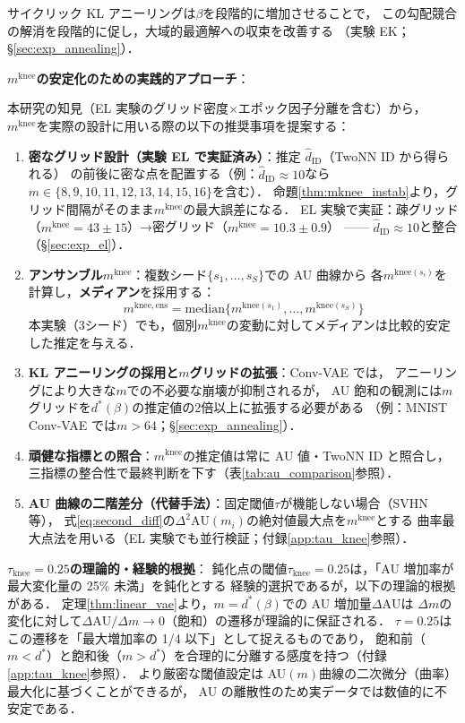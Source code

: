 \documentclass[11pt,a4paper]{jsarticle}
\newcommand{\mknee}{m^{\mathrm{knee}}}
\begin{document}
サイクリック KL アニーリング\cite{fu2019cyclical}は$\beta$を段階的に増加させることで，
この勾配競合の解消を段階的に促し，大域的最適解への収束を改善する
（実験 EK；§\ref{sec:exp_annealing}）．

\textbf{$\mknee$の安定化のための実践的アプローチ}：

本研究の知見（EL 実験のグリッド密度×エポック因子分離を含む）から，
$\mknee$を実際の設計に用いる際の以下の推奨事項を提案する：
\begin{enumerate}
  \item \textbf{密なグリッド設計（実験 EL で実証済み）}：推定 $\hat{d}_\mathrm{ID}$（TwoNN ID から得られる）
        の前後に密な点を配置する（例：$\hat{d}_\mathrm{ID} \approx 10$なら$m \in \{8,9,10,11,12,13,14,15,16\}$を含む）．
        命題\ref{thm:mknee_instab}より，グリッド間隔がそのまま$\mknee$の最大誤差になる．
        EL 実験で実証：疎グリッド（$\mknee=43\pm15$）→密グリッド（$\mknee=10.3\pm0.9$）
        —— $\hat{d}_\mathrm{ID} \approx 10$と整合（§\ref{sec:exp_el}）．
  \item \textbf{アンサンブル$\mknee$}：複数シード$\{s_1,\ldots,s_S\}$での AU 曲線から
        各$m^{\mathrm{knee}(s_i)}$を計算し，\textbf{メディアン}を採用する：
        \begin{equation}
          m^{\mathrm{knee,ens}} = \mathrm{median}\bigl\{m^{\mathrm{knee}(s_1)}, \ldots, m^{\mathrm{knee}(s_S)}\bigr\}
          \label{eq:mknee_ens}
        \end{equation}
        本実験（3シード）でも，個別$\mknee$の変動に対してメディアンは比較的安定した推定を与える．
  \item \textbf{KL アニーリングの採用と$m$グリッドの拡張}：Conv-VAE では，
        アニーリングにより大きな$m$での不必要な崩壊が抑制されるが，
        AU 飽和の観測には$m$グリッドを$d^*(\beta)$の推定値の2倍以上に拡張する必要がある
        （例：MNIST Conv-VAE では$m > 64$；§\ref{sec:exp_annealing}）．
  \item \textbf{頑健な指標との照合}：$\mknee$の推定値は常に AU 値・TwoNN ID と照合し，
        三指標の整合性で最終判断を下す（表\ref{tab:au_comparison}参照）．
  \item \textbf{AU 曲線の二階差分（代替手法）}：固定閾値$\tau$が機能しない場合（SVHN 等），
        式\eqref{eq:second_diff}の$\Delta^2\mathrm{AU}(m_i)$の絶対値最大点を$\mknee$とする
        曲率最大点法を用いる（EL 実験でも並行検証；付録\ref{app:tau_knee}参照）．
\end{enumerate}

\textbf{$\tau_{\mathrm{knee}} = 0.25$の理論的・経験的根拠}：
鈍化点の閾値$\tau_{\mathrm{knee}} = 0.25$は，「AU 増加率が最大変化量の 25\% 未満」を鈍化とする
経験的選択であるが，以下の理論的根拠がある．
定理\ref{thm:linear_vae}より，$m = d^*(\beta)$での AU 増加量$\Delta\mathrm{AU}$は
$\Delta m$の変化に対して$\Delta\mathrm{AU}/\Delta m \to 0$（飽和）の遷移が理論的に保証される．
$\tau = 0.25$はこの遷移を「最大増加率の 1/4 以下」として捉えるものであり，
飽和前（$m < d^*$）と飽和後（$m > d^*$）を合理的に分離する感度を持つ（付録\ref{app:tau_knee}参照）．
より厳密な閾値設定は AU$(m)$曲線の二次微分（曲率）最大化に基づくことができるが，
AU の離散性のため実データでは数値的に不安定である．
\end{document}
